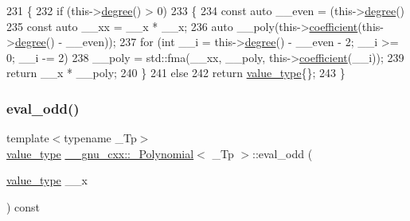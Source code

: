 \begin{DoxyCode}
231     \{
232       \textcolor{keywordflow}{if} (this->\hyperlink{class____gnu__cxx_1_1__Polynomial_a07d9933aeeb9afbd823218ed921336cb}{degree}() > 0)
233         \{
234           \textcolor{keyword}{const} \textcolor{keyword}{auto} \_\_even = (this->\hyperlink{class____gnu__cxx_1_1__Polynomial_a07d9933aeeb9afbd823218ed921336cb}{degree}() %
235           \textcolor{keyword}{const} \textcolor{keyword}{auto} \_\_xx = \_\_x * \_\_x;
236           \textcolor{keyword}{auto} \_\_poly(this->\hyperlink{class____gnu__cxx_1_1__Polynomial_a7cee31b3acbe8c024af6d696bc610f49}{coefficient}(this->\hyperlink{class____gnu__cxx_1_1__Polynomial_a07d9933aeeb9afbd823218ed921336cb}{degree}() - \_\_even));
237           \textcolor{keywordflow}{for} (\textcolor{keywordtype}{int} \_\_i = this->\hyperlink{class____gnu__cxx_1_1__Polynomial_a07d9933aeeb9afbd823218ed921336cb}{degree}() - \_\_even - 2; \_\_i >= 0; \_\_i -= 2)
238             \_\_poly = std::fma(\_\_xx, \_\_poly, this->\hyperlink{class____gnu__cxx_1_1__Polynomial_a7cee31b3acbe8c024af6d696bc610f49}{coefficient}(\_\_i));
239           \textcolor{keywordflow}{return} \_\_x * \_\_poly;
240         \}
241       \textcolor{keywordflow}{else}
242         \textcolor{keywordflow}{return} \hyperlink{class____gnu__cxx_1_1__Polynomial_a725563351f50e76084a7a016c06f8a53}{value\_type}\{\};
243     \}
\end{DoxyCode}
\mbox{\label{class____gnu__cxx_1_1__Polynomial_aff02472cad1aa3b6c8d067fdd4b11bc0}} 
\subsubsection{\texorpdfstring{eval\+\_\+odd()}{eval\_odd()}\hspace{0.1cm}{\footnotesize\ttfamily [2/3]}}
{\footnotesize\ttfamily template$<$typename \+\_\+\+Tp$>$ \\
\hyperlink{class____gnu__cxx_1_1__Polynomial_a725563351f50e76084a7a016c06f8a53}{value\+\_\+type} \hyperlink{class____gnu__cxx_1_1__Polynomial}{\+\_\+\+\_\+gnu\+\_\+cxx\+::\+\_\+\+Polynomial}$<$ \+\_\+\+Tp $>$\+::eval\+\_\+odd (\begin{DoxyParamCaption}\item[{\hyperlink{class____gnu__cxx_1_1__Polynomial_a725563351f50e76084a7a016c06f8a53}{value\+\_\+type}}]{\+\_\+\+\_\+x }\end{DoxyParamCaption}) const}

